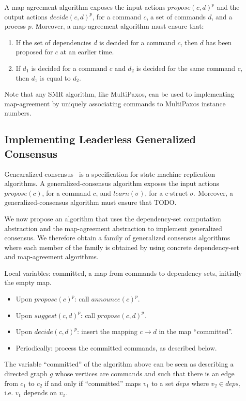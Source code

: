 A map-agreement algorithm exposes the input actions ${propose\left( c, d \right)}^p$ and the output actions ${decide\left( c, d \right)}^p$, for a command $c$, a set of commands $d$, and a process $p$.
Moreover, a map-agreement algorithm must ensure that: 
\begin{enumerate}
    \item If the set of dependencies $d$ is decided for a command $c$, then $d$ has been proposed for $c$ at an earlier time.
    \item If $d_1$ is decided for a command $c$ and $d_2$ is decided for the same command $c$, then $d_1$ is equal to $d_2$.
\end{enumerate}
Note that any SMR algorithm, like MultiPaxos, can be used to implementing map-agreement by uniquely associating commands to MultiPaxos instance numbers.

\subsection{Implementing Leaderless Generalized Consensus}

Genearalized consensus~\cite{Lamport05GeneralizeConsensus} is a specification for state-machine replication algorithms. 
A generalized-consensus algorithm exposes the input actions $propose\left( c \right)$, for a command $c$, and $learn\left( \sigma \right)$, for a c-struct $\sigma$.
Moreover, a generalized-consensus algorithm must ensure that TODO.

We now propose an algorithm that uses the dependency-set computation abstraction and the map-agreement abstraction to implement generalized consensus. We therefore obtain a family of generalized consensus algorithms where each member of the family is obtained by using concrete dependency-set and map-agreement algorithms.

Local variables: committed, a map from commands to dependency sets, initially the empty map.
\begin{itemize}[noitemsep,nolistsep]
    \item Upon ${propose\left( c \right)}^p$: call ${announce\left( c \right)}^p$.
    \item Upon ${suggest\left( c,d \right)}^p$: call ${propose\left( c,d \right)}^p$.
    \item Upon ${decide\left( c,d \right)}^p$: insert the mapping $c \rightarrow d$ in the map ``committed''.
    \item Periodically: process the committed commands, as described below.
\end{itemize}

The variable ``committed'' of the algorithm above can be seen as describing a directed graph $g$ whose vertices are commands and such that there is an edge from $c_1$ to $c_2$ if and only if ``committed'' maps $v_1$ to a set $deps$ where $v_2\in deps$, i.e. $v_1$ depends on $v_2$.



\printbibliography%


